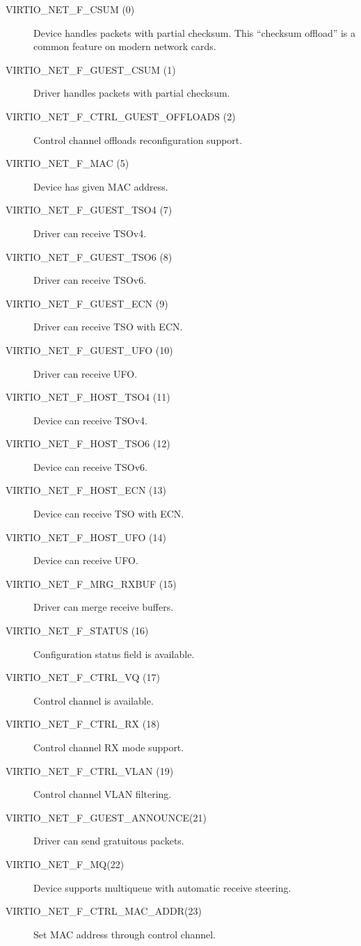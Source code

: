 \begin{description}
\item[VIRTIO_NET_F_CSUM (0)] Device handles packets with partial checksum.   This 
  ``checksum offload'' is a common feature on modern network cards.

\item[VIRTIO_NET_F_GUEST_CSUM (1)] Driver handles packets with partial checksum.

\item[VIRTIO_NET_F_CTRL_GUEST_OFFLOADS (2)] Control channel offloads
        reconfiguration support.

\item[VIRTIO_NET_F_MAC (5)] Device has given MAC address.

\item[VIRTIO_NET_F_GUEST_TSO4 (7)] Driver can receive TSOv4.

\item[VIRTIO_NET_F_GUEST_TSO6 (8)] Driver can receive TSOv6.

\item[VIRTIO_NET_F_GUEST_ECN (9)] Driver can receive TSO with ECN.

\item[VIRTIO_NET_F_GUEST_UFO (10)] Driver can receive UFO.

\item[VIRTIO_NET_F_HOST_TSO4 (11)] Device can receive TSOv4.

\item[VIRTIO_NET_F_HOST_TSO6 (12)] Device can receive TSOv6.

\item[VIRTIO_NET_F_HOST_ECN (13)] Device can receive TSO with ECN.

\item[VIRTIO_NET_F_HOST_UFO (14)] Device can receive UFO.

\item[VIRTIO_NET_F_MRG_RXBUF (15)] Driver can merge receive buffers.

\item[VIRTIO_NET_F_STATUS (16)] Configuration status field is
    available.

\item[VIRTIO_NET_F_CTRL_VQ (17)] Control channel is available.

\item[VIRTIO_NET_F_CTRL_RX (18)] Control channel RX mode support.

\item[VIRTIO_NET_F_CTRL_VLAN (19)] Control channel VLAN filtering.

\item[VIRTIO_NET_F_GUEST_ANNOUNCE(21)] Driver can send gratuitous
    packets.

\item[VIRTIO_NET_F_MQ(22)] Device supports multiqueue with automatic
    receive steering.

\item[VIRTIO_NET_F_CTRL_MAC_ADDR(23)] Set MAC address through control
    channel.
\end{description}

